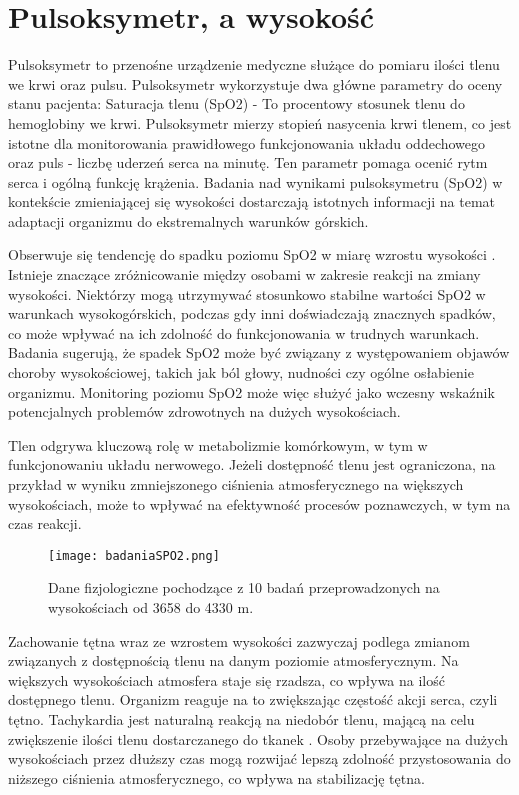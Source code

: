 \section{Pulsoksymetr, a wysokość}
Pulsoksymetr to przenośne urządzenie medyczne służące do pomiaru ilości tlenu we krwi oraz pulsu. Pulsoksymetr wykorzystuje dwa główne parametry do oceny stanu pacjenta: Saturacja tlenu (SpO2) - To procentowy stosunek tlenu do hemoglobiny we krwi. Pulsoksymetr mierzy stopień nasycenia krwi tlenem, co jest istotne dla monitorowania prawidłowego funkcjonowania układu oddechowego oraz puls - liczbę uderzeń serca na minutę. Ten parametr pomaga ocenić rytm serca i ogólną funkcję krążenia. Badania nad wynikami pulsoksymetru (SpO2) w kontekście zmieniającej się wysokości dostarczają istotnych informacji na temat adaptacji organizmu do ekstremalnych warunków górskich.

Obserwuje się tendencję do spadku poziomu SpO2 w miarę wzrostu wysokości \cite{spo2}. Istnieje znaczące zróżnicowanie między osobami w zakresie reakcji na zmiany wysokości. Niektórzy mogą utrzymywać stosunkowo stabilne wartości SpO2 w warunkach wysokogórskich, podczas gdy inni doświadczają znacznych spadków, co może wpływać na ich zdolność do funkcjonowania w trudnych warunkach. Badania sugerują, że spadek SpO2 może być związany z występowaniem objawów choroby wysokościowej, takich jak ból głowy, nudności czy ogólne osłabienie organizmu. Monitoring poziomu SpO2 może więc służyć jako wczesny wskaźnik potencjalnych problemów zdrowotnych na dużych wysokościach.

Tlen odgrywa kluczową rolę w metabolizmie komórkowym, w tym w funkcjonowaniu układu nerwowego. Jeżeli dostępność tlenu jest ograniczona, na przykład w wyniku zmniejszonego ciśnienia atmosferycznego na większych wysokościach, może to wpływać na efektywność procesów poznawczych, w tym na czas reakcji. 

\begin{figure}[!htb]
    \centering
    \texttt{[image: badaniaSPO2.png]}
    \caption{Dane fizjologiczne pochodzące z 10 badań przeprowadzonych na wysokościach od 3658 do 4330 m. \cite{badaniaSPO2}}
\end{figure}

Zachowanie tętna wraz ze wzrostem wysokości zazwyczaj podlega zmianom związanych z dostępnością tlenu na danym poziomie atmosferycznym. Na większych wysokościach atmosfera staje się rzadsza, co wpływa na ilość dostępnego tlenu. Organizm reaguje na to zwiększając częstość akcji serca, czyli tętno. Tachykardia jest naturalną reakcją na niedobór tlenu, mającą na celu zwiększenie ilości tlenu dostarczanego do tkanek \cite{adaptacja}. Osoby przebywające na dużych wysokościach przez dłuższy czas mogą rozwijać lepszą zdolność przystosowania do niższego ciśnienia atmosferycznego, co wpływa na stabilizację tętna.



